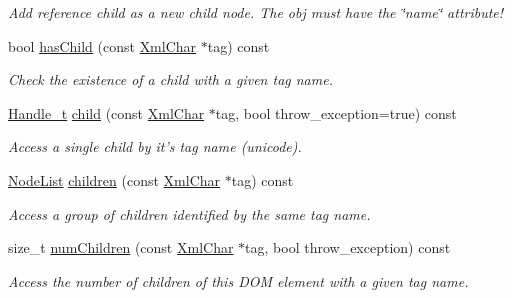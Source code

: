 \begin{DoxyCompactItemize}
\begin{DoxyCompactList}\small\item\em Add reference child as a new child node. The obj must have the \char`\"{}name\char`\"{} attribute! \item\end{DoxyCompactList}\item 
bool \hyperlink{class_d_d4hep_1_1_x_m_l_1_1_handle__t_a6afc1540a4e5fdca604b27a945a8771c}{hasChild} (const \hyperlink{namespace_d_d4hep_1_1_x_m_l_a09e5d9cc86ed782f6826dfe0778c1815}{XmlChar} $\ast$tag) const 
\begin{DoxyCompactList}\small\item\em Check the existence of a child with a given tag name. \item\end{DoxyCompactList}\item 
\hyperlink{class_d_d4hep_1_1_x_m_l_1_1_handle__t}{Handle\_\-t} \hyperlink{class_d_d4hep_1_1_x_m_l_1_1_handle__t_adfaaf622234b7430c823130e4edbd8eb}{child} (const \hyperlink{namespace_d_d4hep_1_1_x_m_l_a09e5d9cc86ed782f6826dfe0778c1815}{XmlChar} $\ast$tag, bool throw\_\-exception=true) const 
\begin{DoxyCompactList}\small\item\em Access a single child by it's tag name (unicode). \item\end{DoxyCompactList}\item 
\hyperlink{class_d_d4hep_1_1_x_m_l_1_1_node_list}{NodeList} \hyperlink{class_d_d4hep_1_1_x_m_l_1_1_handle__t_a8c2c6d2a04d1c4d47ad69b3db18db7f7}{children} (const \hyperlink{namespace_d_d4hep_1_1_x_m_l_a09e5d9cc86ed782f6826dfe0778c1815}{XmlChar} $\ast$tag) const 
\begin{DoxyCompactList}\small\item\em Access a group of children identified by the same tag name. \item\end{DoxyCompactList}\item 
size\_\-t \hyperlink{class_d_d4hep_1_1_x_m_l_1_1_handle__t_aac8ea5266db9275f16c31be61d59fd2a}{numChildren} (const \hyperlink{namespace_d_d4hep_1_1_x_m_l_a09e5d9cc86ed782f6826dfe0778c1815}{XmlChar} $\ast$tag, bool throw\_\-exception) const 
\begin{DoxyCompactList}\small\item\em Access the number of children of this DOM element with a given tag name. \item\end{DoxyCompactList}\item 

\end{DoxyCompactItemize}
